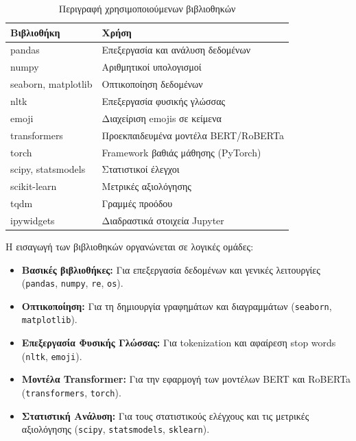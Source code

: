\documentclass[a4paper,11pt,oneside,openany]{ioniothesis}
\begin{document}
\begin{table}[H]
\centering
\caption{Περιγραφή χρησιμοποιούμενων βιβλιοθηκών}
\label{tab:libraries}
\begin{tabular}{@{}ll@{}}
\toprule
\textbf{Βιβλιοθήκη} & \textbf{Χρήση} \\
\midrule
pandas & Επεξεργασία και ανάλυση δεδομένων \\
numpy & Αριθμητικοί υπολογισμοί \\
seaborn, matplotlib & Οπτικοποίηση δεδομένων \\
nltk & Επεξεργασία φυσικής γλώσσας \\
emoji & Διαχείριση emojis σε κείμενα \\
transformers & Προεκπαιδευμένα μοντέλα BERT/RoBERTa \\
torch & Framework βαθιάς μάθησης (PyTorch) \\
scipy, statsmodels & Στατιστικοί έλεγχοι \\
scikit-learn & Μετρικές αξιολόγησης \\
tqdm & Γραμμές προόδου \\
ipywidgets & Διαδραστικά στοιχεία Jupyter \\
\bottomrule
\end{tabular}
\end{table}

Η εισαγωγή των βιβλιοθηκών οργανώνεται σε λογικές ομάδες:

\begin{itemize}
    \item \textbf{Βασικές βιβλιοθήκες:} Για επεξεργασία δεδομένων και γενικές λειτουργίες (\texttt{pandas}, \texttt{numpy}, \texttt{re}, \texttt{os}).
    
    \item \textbf{Οπτικοποίηση:} Για τη δημιουργία γραφημάτων και διαγραμμάτων (\texttt{seaborn}, \texttt{matplotlib}).
    
    \item \textbf{Επεξεργασία Φυσικής Γλώσσας:} Για tokenization και αφαίρεση stop words (\texttt{nltk}, \texttt{emoji}).
    
    \item \textbf{Μοντέλα Transformer:} Για την εφαρμογή των μοντέλων BERT και RoBERTa (\texttt{transformers}, \texttt{torch}).
    
    \item \textbf{Στατιστική Ανάλυση:} Για τους στατιστικούς ελέγχους και τις μετρικές αξιολόγησης (\texttt{scipy}, \texttt{statsmodels}, \texttt{sklearn}).
\end{itemize}
\end{document}
